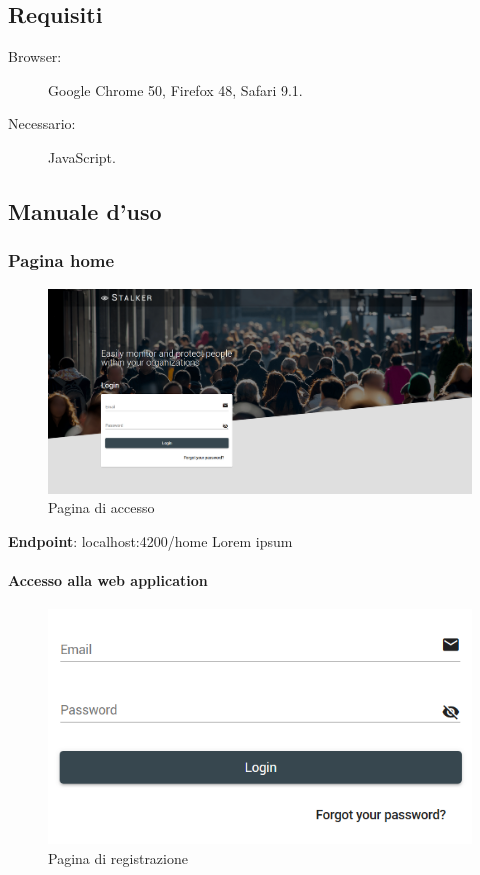 \documentclass[../manuale-utente.tex]{subfiles}
\begin{document}
\subsection{Requisiti}%
\label{sub:requisiti}

\begin{description}
    \item[Browser:] Google Chrome 50, Firefox 48, Safari 9.1.
    \item[Necessario:] JavaScript.
\end{description}


\subsection{Manuale d'uso}%
\label{sub:manuale-uso-web}

\subsubsection{Pagina home}%
\label{subs:pagina-home}

\begin{figure}[H]
    \centering
    \includegraphics{img/web-app/pagina-home.PNG}
    \caption{Pagina di accesso}%
    \label{fig:web-app-pagina-accesso}
\end{figure}

\textbf{Endpoint}: localhost:4200/home
Lorem ipsum

\paragraph{Accesso alla web application}%
\label{par:accesso-alla-web-application}

\begin{figure}[H]
    \centering
    \includegraphics{img/web-app/accesso-web-app.png}
    \caption{Pagina di registrazione}%
    \label{fig:web-app-accesso}
\end{figure}
\end{document}
